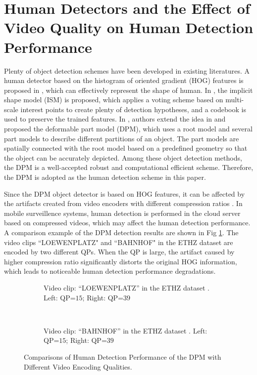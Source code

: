 \documentclass[journal]{IEEEtran}
\begin{document}
\section{Human Detectors and the Effect of Video Quality on Human Detection Performance}
Plenty of object detection schemes have been developed in existing literatures. A human detector based on the histogram of oriented gradient (HOG) features is proposed in \cite{DaTr05}, which can effectively represent the shape of human. In \cite{LeLS08}, the implicit shape model (ISM) is proposed, which applies a voting scheme based on multi-scale interest points to create plenty of detection hypotheses, and a codebook is used to preserve the trained features. In \cite{FGMR10}, authors extend the idea in \cite{DaTr05} and proposed the deformable part model (DPM), which uses a root model and several part models to describe different partitions of an object. The part models are spatially connected with the root model based on a predefined geometry so that the object can be accurately depicted. Among these object detection methods, the DPM is a well-accepted robust and computational efficient scheme. Therefore, the DPM is adopted as the human detection scheme in this paper. 

Since the DPM object detector is based on HOG features, it can be affected by the artifacts created from video encoders with different compression ratios \cite{MiBR13}. In mobile surveillence systems, human detection is performed in the cloud server based on compressed videos, which may affect the human detection performance. A comparison example of the DPM detection results are shown in Fig \ref{fig:DPMComp}. The video clips ``LOEWENPLATZ" and ``BAHNHOF" in the ETHZ dataset \cite{ELSG08} are encoded by two different QPs. When the QP is large, the artifact caused by higher compression ratio significantly distorts the original HOG information, which leads to noticeable human detection performance degradations.


\begin{figure}[t]
\centering
\begin{subfigure}{1\columnwidth}
\caption{Video clip: “LOEWENPLATZ” in the ETHZ dataset \cite{ELSG08}. Left: QP=$15$; Right: QP=$39$}
\end{subfigure}
~
\begin{subfigure}{1\columnwidth}
\caption{Video clip: “BAHNHOF” in the ETHZ dataset \cite{ELSG08}. Left: QP=$15$; Right: QP=$39$}
\end{subfigure}
\caption{Comparisons of Human Detection Performance of the DPM with Different Video Encoding Qualities.}
\label{fig:DPMComp}
\end{figure}
\end{document}
